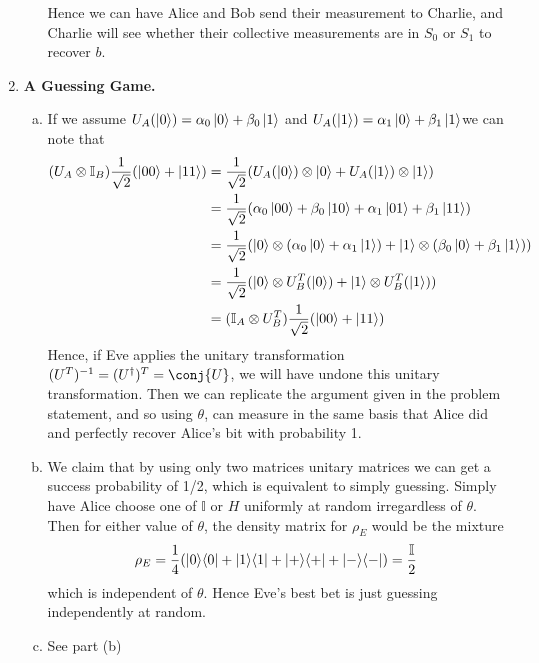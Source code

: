 \documentclass[12pt]{article}
\begin{document}
\begin{enumerate}
\begin{enumerate}[(a)]
 Hence we can have Alice and Bob send their measurement to Charlie, and Charlie will see whether their collective measurements are in $S_0$ or $S_1$ to recover $b$.
\end{enumerate} 





\item \textbf{A Guessing Game.}
\begin{enumerate}[(a)]
\item If we assume $U_A(\ket{0}) = \alpha_0\ket{0}+\beta_0\ket{1}$ and $U_A(\ket{1}) = \alpha_1\ket{0}+\beta_1\ket{1}$we can note that $$\begin{aligned}(U_A\otimes \mathbb{I}_B)\frac{1}{\sqrt{2}}(\ket{00}+\ket{11}) & = \frac{1}{\sqrt{2}}(U_A(\ket{0})\otimes \ket{0} + U_A(\ket{1})\otimes \ket{1}) \\ & = \frac{1}{\sqrt{2}}(\alpha_0\ket{00}+\beta_0\ket{10} + \alpha_1\ket{01}+\beta_1\ket{11}) \\ & = \frac{1}{\sqrt{2}} (\ket{0}\otimes (\alpha_0\ket{0}+\alpha_1\ket{1}) + \ket{1}\otimes (\beta_0\ket{0} + \beta_1\ket{1})) \\ & = \frac{1}{\sqrt{2}}(\ket{0}\otimes U_B^T(\ket{0}) + \ket{1}\otimes U_B^T(\ket{1})) \\ & = (\mathbb{I}_A\otimes U_B^T)\frac{1}{\sqrt{2}}(\ket{00}+\ket{11})\end{aligned}$$ Hence, if Eve applies the unitary transformation $(U^T)^{-1} = (U^\dagger)^T = \conj{U}$, we will have undone this unitary transformation. Then we can replicate the argument given in the problem statement, and so using $\theta$, can measure in the same basis that Alice did and perfectly recover Alice's bit with probability 1. \\

\item We claim that by using only two matrices unitary matrices we can get a success probability of 1/2, which is equivalent to simply guessing. Simply have Alice choose one of $\mathbb{I}$ or $H$ uniformly at random irregardless of $\theta$. Then for either value of $\theta$, the density matrix for $\rho_E$ would be the mixture $$ \rho_E = \frac{1}4 (\ket{0}\!\bra{0} + \ket{1}\!\bra{1} + \ket{+}\!\bra{+} +\ket{-}\!\bra{-}) = \frac{\mathbb{I}}2$$ which is independent of $\theta$. Hence Eve's best bet is just guessing independently at random.

\item See part (b)
\end{enumerate}
\end{enumerate}
\end{document}
